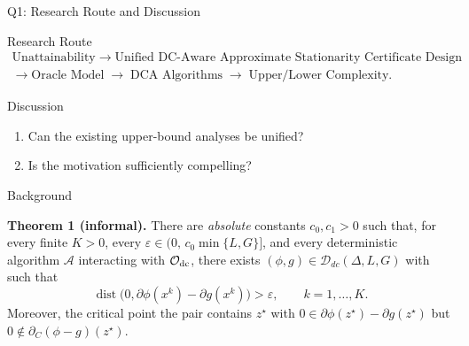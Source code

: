 \documentclass[10pt]{beamer}
\begin{document}
\begin{frame}{Q1: Research Route and Discussion}

\begin{block}{Research Route}
\footnotesize
\[
\begin{gathered}
\text{Unattainability}
\;\to\;
\text{Unified DC-Aware Approximate Stationarity Certificate Design}
\\[-1mm]
\to
\text{Oracle Model}
\;\to\;
\text{DCA Algorithms}
\;\to\;
\text{Upper/Lower Complexity}.
\end{gathered}
\]
\end{block}

\begin{block}{Discussion}
\begin{enumerate}
    \item Can the existing upper-bound analyses be unified?
    \item Is the motivation sufficiently compelling?
\end{enumerate}
\end{block}

\end{frame}

\begin{frame}{Background}
\small

\medskip
\textbf{Theorem 1 (informal).} There are \emph{absolute} constants $c_0,c_1>0$ such that, for every finite
$K > 0$, every $\varepsilon\in\bigl(0,\,c_0\min\{L,G\}\bigr]$, and every
deterministic algorithm $\mathcal A$ interacting with
$\mathcal O_{\rm dc}$, there exists $(\phi,g)\in\mathcal D_{dc}(\Delta,L,G)$
with  such that
$$
    \operatorname{dist}\!\bigl(0,\partial\phi(x^k)-\partial g(x^k)\bigr)
    >\varepsilon,\qquad k=1,\dots,K.
$$
Moreover, the critical point the pair contains $z^\star$ with
$0\in\partial\phi(z^\star)-\partial g(z^\star)$ but $0\notin\partial_C(\phi-g)(z^\star)$.
\end{frame}
\end{document}
